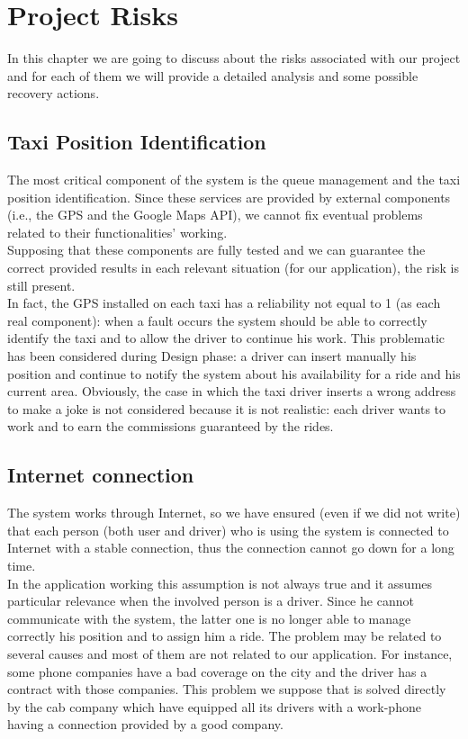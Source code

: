 \documentclass[\mainpath/main]{subfiles}
\begin{document}
\chapter{Project Risks} %
\label{ProjectRisks}

\setmyfancystyle

In this chapter we are going to discuss about the risks associated with our project and for each of them we will provide a detailed analysis and some possible recovery actions.\\

\section{Taxi Position Identification}
The most critical component of the system is the queue management and the taxi position identification. Since these services are provided by external components (i.e., the GPS and the Google Maps API), we cannot fix eventual problems related to their functionalities' working.\\
Supposing that these components are fully tested and we can guarantee the correct provided results in each relevant situation (for our application), the risk is still present.\\
In fact, the GPS installed on each taxi has a reliability not equal to 1 (as each real component): when a fault occurs the system should be able to correctly identify the taxi and to allow the driver to continue his work. This problematic has been considered during Design phase: a driver can insert manually his position and continue to notify the system about his availability for a ride and his current area. Obviously, the case in which the taxi driver inserts a wrong address to make a joke is not considered because it is not realistic: each driver wants to work and to earn the commissions guaranteed by the rides.

\section{Internet connection}
The system works through Internet, so we have ensured (even if we did not write) that each person (both user and driver) who is using the system is connected to Internet with a stable connection, thus the connection cannot go down for a long time.\\
In the application working this assumption is not always true and it assumes particular relevance when the involved person is a driver. Since he cannot communicate with the system, the latter one is no longer able to manage correctly his position and to assign him a ride. The problem may be related to several causes and most of them are not related to our application. For instance, some phone companies have a bad coverage on the city and the driver has a contract with those companies. This problem we suppose that is solved directly by the cab company which have equipped all its drivers with a work-phone having a connection provided by a good company.
\end{document}
